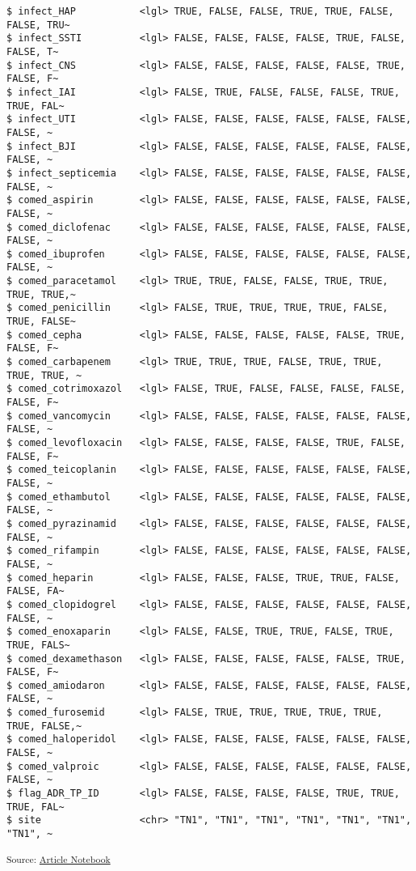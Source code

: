 \documentclass[
  letterpaper,
  DIV=11,
  numbers=noendperiod]{scrartcl}
\begin{document}
\begin{verbatim}
$ infect_HAP           <lgl> TRUE, FALSE, FALSE, TRUE, TRUE, FALSE, FALSE, TRU~
$ infect_SSTI          <lgl> FALSE, FALSE, FALSE, FALSE, TRUE, FALSE, FALSE, T~
$ infect_CNS           <lgl> FALSE, FALSE, FALSE, FALSE, FALSE, TRUE, FALSE, F~
$ infect_IAI           <lgl> FALSE, TRUE, FALSE, FALSE, FALSE, TRUE, TRUE, FAL~
$ infect_UTI           <lgl> FALSE, FALSE, FALSE, FALSE, FALSE, FALSE, FALSE, ~
$ infect_BJI           <lgl> FALSE, FALSE, FALSE, FALSE, FALSE, FALSE, FALSE, ~
$ infect_septicemia    <lgl> FALSE, FALSE, FALSE, FALSE, FALSE, FALSE, FALSE, ~
$ comed_aspirin        <lgl> FALSE, FALSE, FALSE, FALSE, FALSE, FALSE, FALSE, ~
$ comed_diclofenac     <lgl> FALSE, FALSE, FALSE, FALSE, FALSE, FALSE, FALSE, ~
$ comed_ibuprofen      <lgl> FALSE, FALSE, FALSE, FALSE, FALSE, FALSE, FALSE, ~
$ comed_paracetamol    <lgl> TRUE, TRUE, FALSE, FALSE, TRUE, TRUE, TRUE, TRUE,~
$ comed_penicillin     <lgl> FALSE, TRUE, TRUE, TRUE, TRUE, FALSE, TRUE, FALSE~
$ comed_cepha          <lgl> FALSE, FALSE, FALSE, FALSE, FALSE, TRUE, FALSE, F~
$ comed_carbapenem     <lgl> TRUE, TRUE, TRUE, FALSE, TRUE, TRUE, TRUE, TRUE, ~
$ comed_cotrimoxazol   <lgl> FALSE, TRUE, FALSE, FALSE, FALSE, FALSE, FALSE, F~
$ comed_vancomycin     <lgl> FALSE, FALSE, FALSE, FALSE, FALSE, FALSE, FALSE, ~
$ comed_levofloxacin   <lgl> FALSE, FALSE, FALSE, FALSE, TRUE, FALSE, FALSE, F~
$ comed_teicoplanin    <lgl> FALSE, FALSE, FALSE, FALSE, FALSE, FALSE, FALSE, ~
$ comed_ethambutol     <lgl> FALSE, FALSE, FALSE, FALSE, FALSE, FALSE, FALSE, ~
$ comed_pyrazinamid    <lgl> FALSE, FALSE, FALSE, FALSE, FALSE, FALSE, FALSE, ~
$ comed_rifampin       <lgl> FALSE, FALSE, FALSE, FALSE, FALSE, FALSE, FALSE, ~
$ comed_heparin        <lgl> FALSE, FALSE, FALSE, TRUE, TRUE, FALSE, FALSE, FA~
$ comed_clopidogrel    <lgl> FALSE, FALSE, FALSE, FALSE, FALSE, FALSE, FALSE, ~
$ comed_enoxaparin     <lgl> FALSE, FALSE, TRUE, TRUE, FALSE, TRUE, TRUE, FALS~
$ comed_dexamethason   <lgl> FALSE, FALSE, FALSE, FALSE, FALSE, TRUE, FALSE, F~
$ comed_amiodaron      <lgl> FALSE, FALSE, FALSE, FALSE, FALSE, FALSE, FALSE, ~
$ comed_furosemid      <lgl> FALSE, TRUE, TRUE, TRUE, TRUE, TRUE, TRUE, FALSE,~
$ comed_haloperidol    <lgl> FALSE, FALSE, FALSE, FALSE, FALSE, FALSE, FALSE, ~
$ comed_valproic       <lgl> FALSE, FALSE, FALSE, FALSE, FALSE, FALSE, FALSE, ~
$ flag_ADR_TP_ID       <lgl> FALSE, FALSE, FALSE, FALSE, TRUE, TRUE, TRUE, FAL~
$ site                 <chr> "TN1", "TN1", "TN1", "TN1", "TN1", "TN1", "TN1", ~
\end{verbatim}

\textsubscript{Source:
\href{https://AnTangQuoc.github.io/LZD-TP-pred-model/index.qmd.html}{Article
Notebook}}
\end{document}
